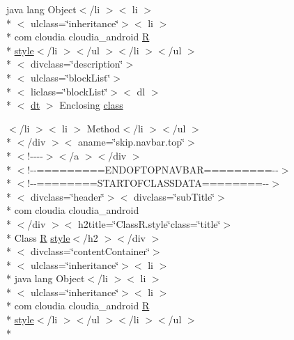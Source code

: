 \begin{DoxyCompactItemize}
 java lang Object$<$/li $>$$<$ li $>$\\*
$<$ ulclass=\char`\"{}inheritance\char`\"{}$>$$<$ li $>$\\*
 com cloudia cloudia\-\_\-android \hyperlink{index-16_8html_a31e8fe59be5c20ce90a0090e28a0c1fe}{R} \\*
\hyperlink{index-17_8html_a2fca283fccfc942ace907bc315fb6b4e}{style}$<$/li $>$$<$/ul $>$$<$/li $>$$<$/ul $>$\\*
$<$ divclass=\char`\"{}description\char`\"{}$>$\\*
$<$ ulclass=\char`\"{}block\-List\char`\"{}$>$\\*
$<$ liclass=\char`\"{}block\-List\char`\"{}$>$$<$ dl $>$\\*
$<$ \hyperlink{stylesheet_8css_a107565fb4039d33b041380d6e0ea1d80}{dt} $>$ Enclosing \hyperlink{_r_8style_8html_a06e690a74d2a8bfc6e241ab9059e32e6}{class}
\item 
$<$/li $>$$<$ li $>$ Method$<$/li $>$$<$/ul $>$\\*
$<$/div $>$$<$ aname=\char`\"{}skip.\-navbar.\-top\char`\"{}$>$\\*
$<$!-\/-\/-\/-\/$>$$<$/a $>$$<$/div $>$\\*
$<$!-\/-\/=========E\-N\-D\-O\-F\-T\-O\-P\-N\-A\-V\-B\-A\-R=========-\/-\/$>$\\*
$<$!-\/-\/========S\-T\-A\-R\-T\-O\-F\-C\-L\-A\-S\-S\-D\-A\-T\-A========-\/-\/$>$\\*
$<$ divclass=\char`\"{}header\char`\"{}$>$$<$ divclass=\char`\"{}sub\-Title\char`\"{}$>$\\*
 com cloudia cloudia\-\_\-android\\*
$<$/div $>$$<$ h2title=\char`\"{}Class\-R.\-style\char`\"{}class=\char`\"{}title\char`\"{}$>$\\*
 Class \hyperlink{index-16_8html_a31e8fe59be5c20ce90a0090e28a0c1fe}{R} \hyperlink{index-17_8html_a2fca283fccfc942ace907bc315fb6b4e}{style}$<$/h2 $>$$<$/div $>$\\*
$<$ divclass=\char`\"{}content\-Container\char`\"{}$>$\\*
$<$ ulclass=\char`\"{}inheritance\char`\"{}$>$$<$ li $>$\\*
 java lang Object$<$/li $>$$<$ li $>$\\*
$<$ ulclass=\char`\"{}inheritance\char`\"{}$>$$<$ li $>$\\*
 com cloudia cloudia\-\_\-android \hyperlink{index-16_8html_a31e8fe59be5c20ce90a0090e28a0c1fe}{R} \\*
\hyperlink{index-17_8html_a2fca283fccfc942ace907bc315fb6b4e}{style}$<$/li $>$$<$/ul $>$$<$/li $>$$<$/ul $>$\\*

\end{DoxyCompactItemize}
